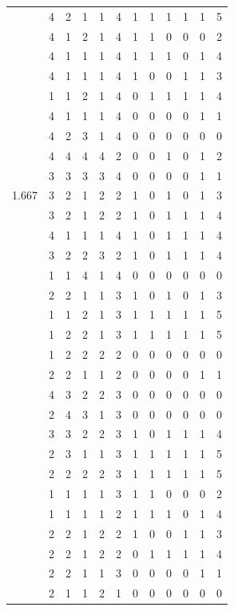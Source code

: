 \documentclass[]{book}
\theoremstyle{definition}
\theoremstyle{definition}
\theoremstyle{definition}
\theoremstyle{remark}
\begin{document}
\begin{table}
{\begin{tabular}[t]{rrrrrrrrrrrr}
 & 4 & 2 & 1 & 1 & 4 & 1 & 1 & 1 & 1 & 1 & 5\\
 & 4 & 1 & 2 & 1 & 4 & 1 & 1 & 0 & 0 & 0 & 2\\
 & 4 & 1 & 1 & 1 & 4 & 1 & 1 & 1 & 0 & 1 & 4\\
 & 4 & 1 & 1 & 1 & 4 & 1 & 0 & 0 & 1 & 1 & 3\\
 & 1 & 1 & 2 & 1 & 4 & 0 & 1 & 1 & 1 & 1 & 4\\
 & 4 & 1 & 1 & 1 & 4 & 0 & 0 & 0 & 0 & 1 & 1\\
 & 4 & 2 & 3 & 1 & 4 & 0 & 0 & 0 & 0 & 0 & 0\\
 & 4 & 4 & 4 & 4 & 2 & 0 & 0 & 1 & 0 & 1 & 2\\
 & 3 & 3 & 3 & 3 & 4 & 0 & 0 & 0 & 0 & 1 & 1\\
1.667 & 3 & 2 & 1 & 2 & 2 & 1 & 0 & 1 & 0 & 1 & 3\\
 & 3 & 2 & 1 & 2 & 2 & 1 & 0 & 1 & 1 & 1 & 4\\
 & 4 & 1 & 1 & 1 & 4 & 1 & 0 & 1 & 1 & 1 & 4\\
 & 3 & 2 & 2 & 3 & 2 & 1 & 0 & 1 & 1 & 1 & 4\\
 & 1 & 1 & 4 & 1 & 4 & 0 & 0 & 0 & 0 & 0 & 0\\
 & 2 & 2 & 1 & 1 & 3 & 1 & 0 & 1 & 0 & 1 & 3\\
 & 1 & 1 & 2 & 1 & 3 & 1 & 1 & 1 & 1 & 1 & 5\\
 & 1 & 2 & 2 & 1 & 3 & 1 & 1 & 1 & 1 & 1 & 5\\
 & 1 & 2 & 2 & 2 & 2 & 0 & 0 & 0 & 0 & 0 & 0\\
 & 2 & 2 & 1 & 1 & 2 & 0 & 0 & 0 & 0 & 1 & 1\\
 & 4 & 3 & 2 & 2 & 3 & 0 & 0 & 0 & 0 & 0 & 0\\
 & 2 & 4 & 3 & 1 & 3 & 0 & 0 & 0 & 0 & 0 & 0\\
 & 3 & 3 & 2 & 2 & 3 & 1 & 0 & 1 & 1 & 1 & 4\\
 & 2 & 3 & 1 & 1 & 3 & 1 & 1 & 1 & 1 & 1 & 5\\
 & 2 & 2 & 2 & 2 & 3 & 1 & 1 & 1 & 1 & 1 & 5\\
 & 1 & 1 & 1 & 1 & 3 & 1 & 1 & 0 & 0 & 0 & 2\\
 & 1 & 1 & 1 & 1 & 2 & 1 & 1 & 1 & 0 & 1 & 4\\
 & 2 & 2 & 1 & 2 & 2 & 1 & 0 & 0 & 1 & 1 & 3\\
 & 2 & 2 & 1 & 2 & 2 & 0 & 1 & 1 & 1 & 1 & 4\\
 & 2 & 2 & 1 & 1 & 3 & 0 & 0 & 0 & 0 & 1 & 1\\
 & 2 & 1 & 1 & 2 & 1 & 0 & 0 & 0 & 0 & 0 & 0\\

\end{tabular}}
\end{table}
\end{document}
